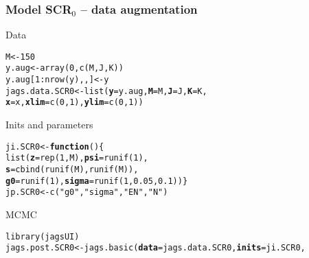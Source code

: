 \documentclass[color=usenames,dvipsnames]{beamer}\usepackage[]{graphicx}\usepackage[]{color}
\makeatletter
\newcommand{\hlnum}[1]{\textcolor[rgb]{0.69,0.494,0}{#1}}%
\newcommand{\hlstr}[1]{\textcolor[rgb]{0.749,0.012,0.012}{#1}}%
\newcommand{\hlopt}[1]{\textcolor[rgb]{0,0,0}{#1}}%
\newcommand{\hlstd}[1]{\textcolor[rgb]{0,0,0}{#1}}%
\newcommand{\hlkwa}[1]{\textcolor[rgb]{0,0,0}{\textbf{#1}}}%
\newcommand{\hlkwb}[1]{\textcolor[rgb]{0,0.341,0.682}{#1}}%
\newcommand{\hlkwc}[1]{\textcolor[rgb]{0,0,0}{\textbf{#1}}}%
\newcommand{\hlkwd}[1]{\textcolor[rgb]{0.004,0.004,0.506}{#1}}%
\newenvironment{kframe}{%
 \def\at@end@of@kframe{}%
 \ifinner\ifhmode%
  \def\at@end@of@kframe{\end{minipage}}%
  \begin{minipage}{\columnwidth}%
 \fi\fi%
 \def\FrameCommand##1{\hskip\@totalleftmargin \hskip-\fboxsep
 \colorbox{shadecolor}{##1}\hskip-\fboxsep
     \hskip-\linewidth \hskip-\@totalleftmargin \hskip\columnwidth}%
 \MakeFramed {\advance\hsize-\width
   \@totalleftmargin\z@ \linewidth\hsize
   \@setminipage}}%
 {\par\unskip\endMakeFramed%
 \at@end@of@kframe}
\newenvironment{knitrout}{}{} %
\makeatother
\begin{document}
\begin{frame}[fragile]
  \frametitle{Model SCR$_0$ -- data augmentation}
  Data
  \vspace{-6pt}
\begin{knitrout}\scriptsize
{}\color{fgcolor}\begin{kframe}
\begin{alltt}
\hlstd{M} \hlkwb{<-} \hlnum{150}
\hlstd{y.aug} \hlkwb{<-} \hlkwd{array}\hlstd{(}\hlnum{0}\hlstd{,} \hlkwd{c}\hlstd{(M, J, K))}
\hlstd{y.aug[}\hlnum{1}\hlopt{:}\hlkwd{nrow}\hlstd{(y),,]} \hlkwb{<-} \hlstd{y}
\hlstd{jags.data.SCR0} \hlkwb{<-} \hlkwd{list}\hlstd{(}\hlkwc{y}\hlstd{=y.aug,} \hlkwc{M}\hlstd{=M,} \hlkwc{J}\hlstd{=J,} \hlkwc{K}\hlstd{=K,}
                       \hlkwc{x}\hlstd{=x,} \hlkwc{xlim}\hlstd{=}\hlkwd{c}\hlstd{(}\hlnum{0}\hlstd{,}\hlnum{1}\hlstd{),} \hlkwc{ylim}\hlstd{=}\hlkwd{c}\hlstd{(}\hlnum{0}\hlstd{,}\hlnum{1}\hlstd{))}
\end{alltt}
\end{kframe}
\end{knitrout}
\pause
\vfill
  Inits and parameters
  \vspace{-6pt}
\begin{knitrout}\scriptsize
{}\color{fgcolor}\begin{kframe}
\begin{alltt}
\hlstd{ji.SCR0} \hlkwb{<-} \hlkwa{function}\hlstd{() \{}
    \hlkwd{list}\hlstd{(}\hlkwc{z}\hlstd{=}\hlkwd{rep}\hlstd{(}\hlnum{1}\hlstd{,M),} \hlkwc{psi}\hlstd{=}\hlkwd{runif}\hlstd{(}\hlnum{1}\hlstd{),}
         \hlkwc{s}\hlstd{=}\hlkwd{cbind}\hlstd{(}\hlkwd{runif}\hlstd{(M),} \hlkwd{runif}\hlstd{(M)),}
         \hlkwc{g0}\hlstd{=}\hlkwd{runif}\hlstd{(}\hlnum{1}\hlstd{),} \hlkwc{sigma}\hlstd{=}\hlkwd{runif}\hlstd{(}\hlnum{1}\hlstd{,} \hlnum{0.05}\hlstd{,} \hlnum{0.1}\hlstd{)) \}}
\hlstd{jp.SCR0} \hlkwb{<-} \hlkwd{c}\hlstd{(}\hlstr{"g0"}\hlstd{,} \hlstr{"sigma"}\hlstd{,} \hlstr{"EN"}\hlstd{,} \hlstr{"N"}\hlstd{)}
\end{alltt}
\end{kframe}
\end{knitrout}
\pause
\vfill
MCMC
  \vspace{-6pt}
\begin{knitrout}\scriptsize
{}\color{fgcolor}\begin{kframe}
\begin{alltt}
\hlkwd{library}\hlstd{(jagsUI)}
\hlstd{jags.post.SCR0} \hlkwb{<-} \hlkwd{jags.basic}\hlstd{(}\hlkwc{data}\hlstd{=jags.data.SCR0,} \hlkwc{inits}\hlstd{=ji.SCR0,}

\end{alltt}
\end{kframe}
\end{knitrout}
\end{frame}
\end{document}
